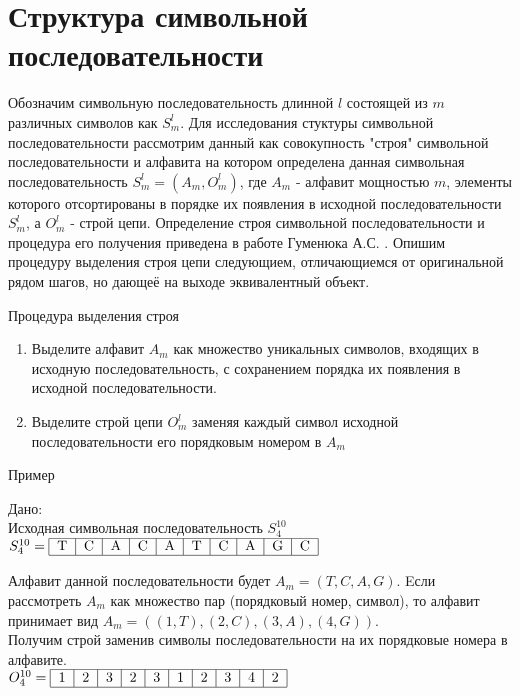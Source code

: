 \part{Структура символьной последовательности}

Обозначим символьную последовательность длинной $l$ состоящей из $m$ различных символов как $S^{l}_{m}$.
Для исследования стуктуры символьной последовательности рассмотрим данный как совокупность "строя" символьной последовательности
и алфавита на котором определена данная символьная последовательность $S^{l}_{m}=(A_{m}, O^{l}_{m})$, 
где $A_{m}$ - алфавит мощностью $m$, элементы которого отсортированы в порядке их появления в исходной последовательности $S^{l}_{m}$, 
а $O^{l}_{m}$ - строй цепи.
Определение строя символьной последовательности и процедура его получения  приведена в работе Гуменюка А.С. \cite{gumenuk_base}.
Опишим процедуру выделения строя цепи следующием, отличающиемся от оригинальной рядом шагов, но дающеё на выходе эквивалентный объект.

\subparagraph{Процедура выделения строя}

\begin{enumerate}
 \item Выделите алфавит $A_{m}$ как множество уникальных символов, входящих в исходную последовательность, 
       с сохранением порядка их появления  в исходной последовательности.
 \item Выделите строй цепи $O^{l}_{m}$ заменяя каждый символ исходной последовательности его порядковым номером в $A_{m}$
\end{enumerate}

\subparagraph{Пример}

Дано:\\
  Исходная символьная последовательность $S^{10}_{4}$\\ 
  $S^{10}_{4} = \begin{tabular}{|c|c|c|c|c|c|c|c|c|c|}
  \hline
  T & C & A & C & A & T & C & A & G & C \\
  \hline
  \end{tabular}$
 
 Алфавит данной последовательности будет $A_{m} = (T, C, A, G)$.
 Eсли рассмотреть $A_{m}$ как множество пар (порядковый номер, символ), то алфавит принимает вид $A_{m} = ((1, T), (2, C), (3, A), (4, G))$.\\
 Получим строй заменив символы последовательности на их порядковые номера в алфавите. \\
  $O^{10}_{4} = \begin{tabular}{|c|c|c|c|c|c|c|c|c|c|}
  \hline
  1 & 2 & 3 & 2 & 3 & 1 & 2 & 3 & 4 & 2 \\
  \hline
  \end{tabular}$ \\
 
